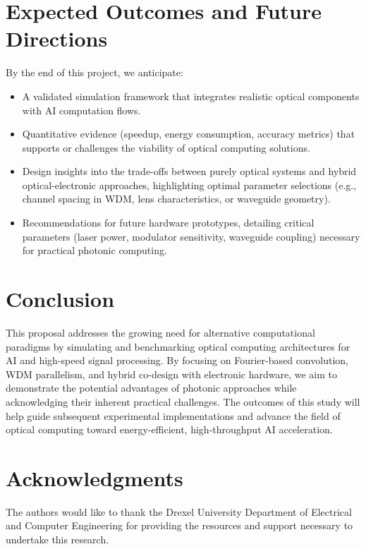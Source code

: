 \documentclass[conference]{IEEEtran}
\begin{document}
\section{Expected Outcomes and Future Directions}
By the end of this project, we anticipate:
\begin{itemize}
    \item A validated simulation framework that integrates realistic optical components with AI computation flows.
    \item Quantitative evidence (speedup, energy consumption, accuracy metrics) that supports or challenges the viability of optical computing solutions.
    \item Design insights into the trade-offs between purely optical systems and hybrid optical-electronic approaches, highlighting optimal parameter selections (e.g., channel spacing in WDM, lens characteristics, or waveguide geometry).
    \item Recommendations for future hardware prototypes, detailing critical parameters (laser power, modulator sensitivity, waveguide coupling) necessary for practical photonic computing.
\end{itemize}

\section{Conclusion}
This proposal addresses the growing need for alternative computational paradigms by simulating and benchmarking optical computing architectures for AI and high-speed signal processing. By focusing on Fourier-based convolution, WDM parallelism, and hybrid co-design with electronic hardware, we aim to demonstrate the potential advantages of photonic approaches while acknowledging their inherent practical challenges. The outcomes of this study will help guide subsequent experimental implementations and advance the field of optical computing toward energy-efficient, high-throughput AI acceleration.

\section*{Acknowledgments}
The authors would like to thank the Drexel University Department of Electrical and Computer Engineering for providing the resources and support necessary to undertake this research.
\end{document}
